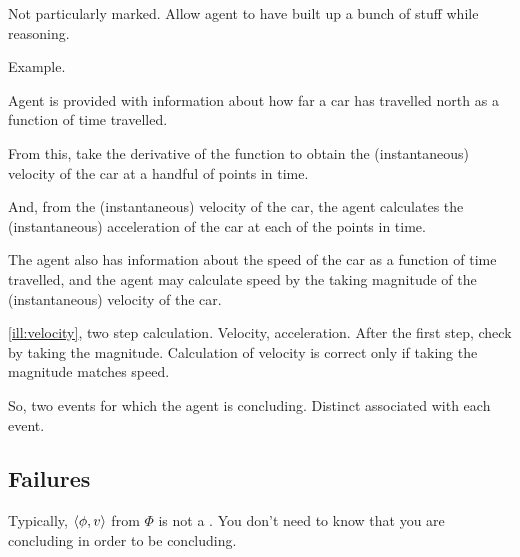 \begin{note}
  Not particularly marked.
  Allow agent to have built up a bunch of stuff while reasoning.

  Example.

  \begin{scenario}[Velocity]
    \label{ill:velocity}
    Agent is provided with information about how far a car has travelled north as a function of time travelled.

    From this, take the derivative of the function to obtain the (instantaneous) velocity of the car at a handful of points in time.

    And, from the (instantaneous) velocity of the car, the agent calculates the (instantaneous) acceleration of the car at each of the points in time.

    The agent also has information about the speed of the car as a function of time travelled, and the agent may calculate speed by the taking magnitude of the (instantaneous) velocity of the car.
  \end{scenario}

  \autoref{ill:velocity}, two step calculation.
  Velocity, acceleration.
  After the first step, check by taking the magnitude.
  Calculation of velocity is correct only if taking the magnitude matches speed.

  So, two events for which the agent is concluding.
  Distinct  associated with each event.
\end{note}


\subsection{Failures}
\label{sec:failures-1}

\begin{note}
  Typically, \(\langle \phi, v \rangle\) from \(\Phi\) is not a \requ{}.
  You don't need to know that you are concluding in order to be concluding.
\end{note}

